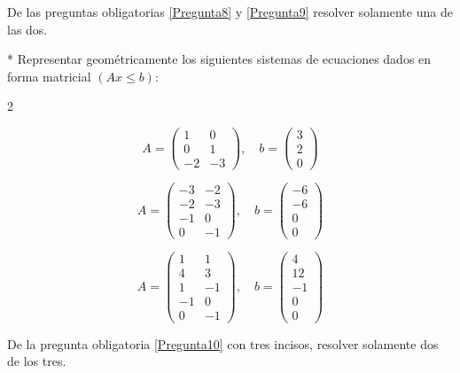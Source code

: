 \begin{Note}\label{Nota5}
De las preguntas obligatorias \ref{Pregunta8} y \ref{Pregunta9} resolver solamente una de las dos.
\end{Note}

\begin{Quest}* \label{Pregunta10}
Representar geom\'etricamente los siguientes sistemas de ecuaciones dados en forma matricial $(Ax \le b)$:
\begin{itemize}
\begin{multicols}{2}
\item[a) ]
\[
A=
\begin{pmatrix}
1 & 0 \\
0 & 1 \\
-2 & -3
\end{pmatrix},
\quad
b=
\begin{pmatrix}
3\\
2\\
0
\end{pmatrix}
\]

\item[c) ]
\[
A=
\begin{pmatrix}
-3 & -2\\
-2 & -3\\
-1 & 0\\
0 & -1
\end{pmatrix},
\quad
b=
\begin{pmatrix}
-6\\
-6\\
0\\
0
\end{pmatrix}
\]

\item[d) ]
\[
A=
\begin{pmatrix}
1 & 1\\
4 & 3\\
1 & -1\\
-1 & 0\\
0 & -1
\end{pmatrix},
\quad
b=
\begin{pmatrix}
4\\
12\\
-1\\
0\\
0
\end{pmatrix}
\]
\end{multicols}
\end{itemize}
\end{Quest}
\begin{Note}\label{Nota6}
De la pregunta obligatoria \ref{Pregunta10} con tres incisos, resolver solamente dos de los tres.
\end{Note}

